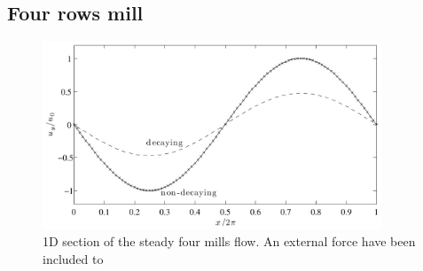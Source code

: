 \subsection{Four rows mill}\label{sec:mb:four_rows}

\begin{figure}
\begin{center}
\includegraphics[width=0.9\textwidth]{fig/four_mill.pdf}
\end{center}
\caption{1D section of the steady four mills flow. An external force
  have been included to }
\label{fig:mb:four_mill}
\end{figure}

